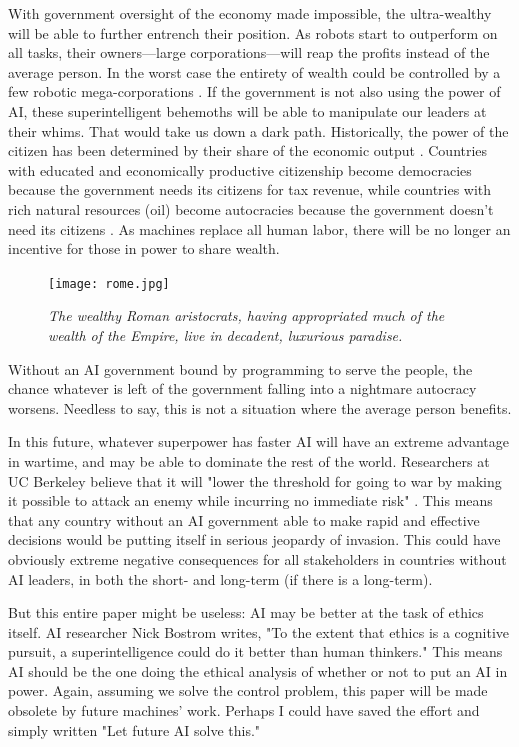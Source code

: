 \documentclass[12pt]{article}
\newenvironment{quote_1in}%
  {\list{}{\leftmargin=1in\rightmargin=1in}\item[]}%
  {\endlist}
\begin{document}
With government oversight of the economy made impossible, the ultra-wealthy will be able to further entrench their position. As robots start to outperform on all tasks, their owners---large corporations---will reap the profits instead of the average person. In the worst case the entirety of wealth could be controlled by a few robotic mega-corporations \cite{bostrom2014superintelligence}. If the government is not also using the power of AI, these superintelligent behemoths will be able to manipulate our leaders at their whims. That would take us down a dark path. Historically, the power of the citizen has been determined by their share of the economic output \cite{acemoglu2008persistence}. Countries with educated and economically productive citizenship become democracies because the government needs its citizens for tax revenue, while countries with rich natural resources (oil) become autocracies because the government doesn't need its citizens \cite{ross2001does}. As machines replace all human labor, there will be no longer an incentive for those in power to share wealth.
\bigskip
\begin{figure}[hb]
\centering
\texttt{[image: rome.jpg]}
\begin{quote_1in}
    \caption{
    \textit{The wealthy Roman aristocrats, having appropriated much of the wealth of the Empire, live in decadent, luxurious paradise.} \cite{rome}}
\end{quote_1in}
\end{figure}
Without an AI government bound by programming to serve the people, the chance whatever is left of the government falling into a nightmare autocracy worsens. Needless to say, this is not a situation where the average person benefits.

In this future, whatever superpower has faster AI will have an extreme advantage in wartime, and may be able to dominate the rest of the world. Researchers at UC Berkeley believe that it will "lower the threshold for going to war by making it possible to attack an enemy while incurring no immediate risk" \cite{russell2015ethics}. This means that any country without an AI government able to make rapid and effective decisions would be putting itself in serious jeopardy of invasion. This could have obviously extreme negative consequences for all stakeholders in countries without AI leaders, in both the short- and long-term (if there is a long-term).

But this entire paper might be useless: AI may be better at the task of ethics itself. AI researcher Nick Bostrom writes, "To the extent that ethics is a cognitive pursuit, a superintelligence could do it better than human thinkers." \cite{bostrom2003ethical} This means AI should be the one doing the ethical analysis of whether or not to put an AI in power. Again, assuming we solve the control problem, this paper will be made obsolete by future machines' work. Perhaps I could have saved the effort and simply written "Let future AI solve this."
\end{document}
